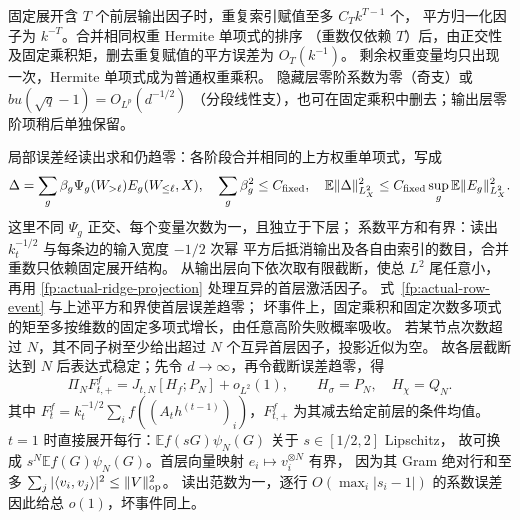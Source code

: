 \documentclass[a4paper]{tufte-handout}
\newcommand{\E}{\mathbb E}
\begin{document}
\begin{fullwidth}
固定展开含 $T$ 个前层输出因子时，重复索引赋值至多 $C_Tk^{T-1}$ 个，
平方归一化因子为 $k^{-T}$。合并相同权重 Hermite 单项式的排序
（重数仅依赖 $T$）后，由正交性及固定乘积矩，删去重复赋值的平方误差为 $O_T(k^{-1})$。
剩余权重变量均只出现一次，Hermite 单项式成为普通权重乘积。
隐藏层零阶系数为零（奇支）或 $bu(\sqrt q-1)=O_{L^p}(d^{-1/2})$
（分段线性支），也可在固定乘积中删去；输出层零阶项稍后单独保留。

局部误差经读出求和仍趋零：各阶段合并相同的上方权重单项式，写成
\begin{equation}\label{fp:actual-phase-bound}
 \Delta=\sum_g\beta_g\Psi_g(W_{>\ell})E_g(W_{\le\ell},X),
 \quad \sum_g\beta_g^2\le C_{\rm fixed},
 \quad \E\|\Delta\|_{L^2_X}^2
 \le C_{\rm fixed}\sup_g\E\|E_g\|_{L^2_X}^2.
\end{equation}
这里不同 $\Psi_g$ 正交、每个变量次数为一，且独立于下层；
系数平方和有界：读出 $k_t^{-1/2}$ 与每条边的输入宽度 $-1/2$ 次幂
平方后抵消输出及各自由索引的数目，合并重数只依赖固定展开结构。
从输出层向下依次取有限截断，使总 $L^2$ 尾任意小，再用
\eqref{fp:actual-ridge-projection} 处理互异的首层激活因子。
式~\eqref{fp:actual-row-event} 与上述平方和界使首层误差趋零；
坏事件上，固定乘积和固定次数多项式的矩至多按维数的固定多项式增长，由任意高阶失败概率吸收。
若某节点次数超过 $N$，其不同子树至少给出超过 $N$ 个互异首层因子，投影近似为空。
故各层截断达到 $N$ 后表达式稳定；先令 $d\to\infty$，再令截断误差趋零，得
\begin{equation}\label{fp:actual-positive-local}
 \Pi_NF_{t,+}^f=J_{t,N}[H_f;P_N]+o_{L^2}(1),\qquad
 H_\sigma=P_N,\quad H_\chi=Q_N.
\end{equation}
其中 $F_t^f=k_t^{-1/2}\sum_i f((A_th^{(t-1)})_i)$，$F_{t,+}^f$ 为其减去给定前层的条件均值。
$t=1$ 时直接展开每行：$\E f(sG)\psi_N(G)$ 关于 $s\in[1/2,2]$ Lipschitz，
故可换成 $s^N\E f(G)\psi_N(G)$。首层向量映射 $e_i\mapsto v_i^{\otimes N}$ 有界，
因为其 Gram 绝对行和至多 $\sum_j|\langle v_i,v_j\rangle|^2\le\|V\|_{\rm op}^2$。
读出范数为一，逐行 $O(\max_i|s_i-1|)$ 的系数误差因此给总 $o(1)$，坏事件同上。


\end{fullwidth}
\end{document}
